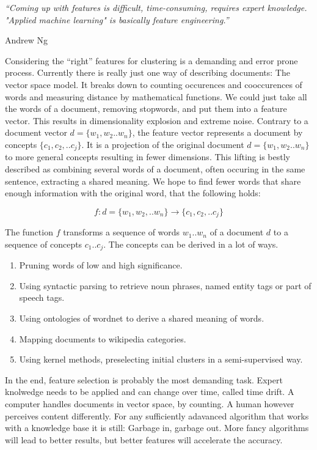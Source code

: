 \epigraph{\emph{
  ``Coming up with features is difficult, time-consuming, requires expert knowledge. "Applied machine learning" is basically feature engineering.''
}}{ Andrew Ng }

Considering the ``right'' features for clustering is a demanding and error prone process. Currently there is really just one way of describing documents: The vector space model. It breaks down to counting occurences and cooccurences of words and measuring distance by mathematical functions. We could just take all the words of a document, removing stopwords, and put them into a feature vector. This results in dimensionality explosion and extreme noise. Contrary to a document vector $d = \{w_1,w_2..w_n\}$, the feature vector represents a document by concepts $\{c_1,c_2,..c_j\}$. It is a projection of the original document $d = \{w_1,w_2..w_n\}$ to more general concepts resulting in fewer dimensions. This lifting is bestly described as combining several words of a document, often occuring in the same sentence, extracting a shared meaning. We hope to find fewer words that share enough information with the original word, that the following holds:
  
  \begin{equation}
    f : d=\{w_1,w_2,..w_n\} \to \{c_1,c_2,..c_j\}
  \end{equation}

The function $f$ transforms a sequence of words $w_1..w_n$ of a document $d$ to a sequence of concepts $c_1..c_j$. The concepts can be derived in a lot of ways.

  \begin{enumerate}
    \item Pruning words of low and high significance.
    \item Using syntactic parsing to retrieve noun phrases, named entity tags or part of speech tags.
    \item Using ontologies of wordnet to derive a shared meaning of words.
    \item Mapping documents to wikipedia categories.
    \item Using kernel methods, preselecting initial clusters in a semi-supervised way.
  \end{enumerate}

In the end, feature selection is probably the most demanding task. Expert knolwedge needs to be applied and can change over time, called time drift. A computer handles documents in vector space, by counting. A human however perceives content differently. For any sufficiently adavanced algorithm that works with a knowledge base it is still: Garbage in, garbage out. More fancy algorithms will lead to better results, but better features will accelerate the accuracy.\\

